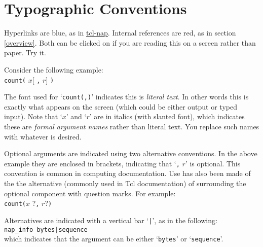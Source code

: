       \section{Typographic Conventions}

Hyperlinks are blue, as in
\href{http://tcl-nap.sourceforge.net/index.php}{tcl-nap}.
Internal references are red, as in section \ref{overview}.
Both can be clicked on if you are reading this on a screen rather than paper.
Try it.

    \par Consider the following example:
    \\
    \texttt{count(}
    $x$[
    \texttt{,}
    $r$]
    \texttt{)}
    \par The font used for `\texttt{count(,)}' indicates this is 
    \textit{literal text}. In other words this is exactly what appears
    on the screen (which could be either output or typed input). Note
    that `$x$' 
    and `$r$' are in italics (with slanted font), which
    indicates these are 
    \textit{formal argument names} rather than literal text. You
    replace such names with whatever is desired.
    \par Optional arguments are indicated using two alternative
    conventions. In the above example they are enclosed in brackets,
    indicating that `\texttt{,} $r$' is optional. This convention is common in
    computing documentation. Use has also been made of the the
    alternative (commonly used in Tcl documentation) of surrounding the
    optional component with question marks. For example:
    \\
    \texttt{count(}$x$ ?\texttt{,} $r$?\texttt{)}
    \par Alternatives are indicated with a vertical bar `\texttt{|}', as
    in the following:
    \\
    \texttt{nap\_info bytes|sequence}
    \\
    which indicates that the argument can be either `\texttt{bytes}' or `\texttt{sequence}'.
